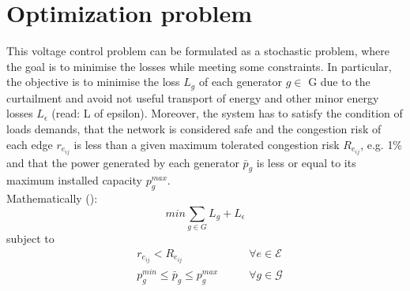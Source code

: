 \section{Optimization problem}
This voltage control problem can be formulated as a stochastic problem, where the goal is to minimise the losses while meeting some constraints. In particular, the objective is to minimise the loss $L_g$ of each generator $g \in$ \gls{G} due to the curtailment and avoid not useful transport of energy and other minor energy losses $L_{\epsilon}$ (read: L of epsilon). Moreover, the system has to satisfy the condition of loads demands, that the network is considered safe and the congestion risk of each edge $r_{e_{ij}}$ is less than a given maximum tolerated congestion risk $R_{e_{ij}}$, e.g. {1\%} and that the power generated by each generator $\bar{p}_g$ is less or equal to its maximum installed capacity $p^{max}_g$. \\
Mathematically (\cite{haulogypaper}):
\[
min \sum_{g \in G} L_g + L_{\epsilon}
\]
subject to
\begin{equation*}
\begin{aligned}
& r_{e_{ij}} < R_{e_{ij}} \qquad & \forall e \in \mathcal{E} \\
& p^{min}_g \leq \bar{p}_g \leq p^{max}_g \qquad & \forall g \in \mathcal{G} \\
\end{aligned}
\end{equation*}



